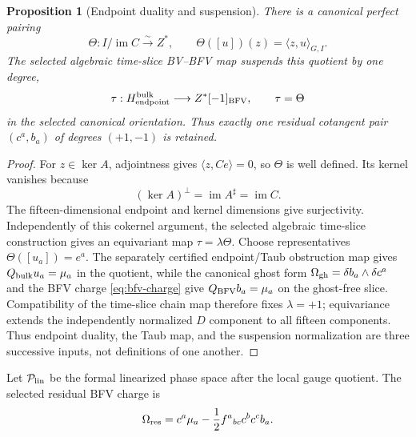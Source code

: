 \documentclass[11pt]{article}
\newtheorem{proposition}[theorem]{Proposition}
\theoremstyle{remark}
\newcommand{\im}{\operatorname{im}}
\begin{document}
\begin{proposition}[Endpoint duality and suspension]\label{prop:endpoint}
There is a canonical perfect pairing
\begin{equation}\label{eq:endpoint}
 \Theta:I/\im C\xrightarrow{\sim}Z^*,
 \qquad \Theta([u])(z)=\langle z,u\rangle_{G,I}.
\end{equation}
The selected algebraic time-slice BV--BFV map suspends this quotient by one
degree,
\begin{equation}\label{eq:suspension}
 \tau:H^{\rm bulk}_{\rm endpoint}\longrightarrow Z^*[-1]_{\rm BFV},
 \qquad \tau=\Theta
\end{equation}
in the selected canonical orientation.  Thus exactly one residual cotangent
pair $(c^a,b_a)$ of degrees $(+1,-1)$ is retained.
\end{proposition}

\begin{proof}
For $z\in\ker A$, adjointness gives $\langle z,Ce\rangle=0$, so $\Theta$
is well defined.  Its kernel vanishes because
\begin{equation*}
 (\ker A)^\perp=\im A^\sharp=\im C.
\end{equation*}
The fifteen-dimensional endpoint and kernel dimensions give surjectivity.
Independently of this cokernel argument, the selected algebraic time-slice
construction gives an equivariant map $\tau=\lambda\Theta$.  Choose representatives
$\Theta([u_a])=e^a$.  The separately certified endpoint/Taub obstruction map
gives $Q_{\rm bulk}u_a=\mu_a$ in the quotient, while the canonical ghost form
$\Omega_{\rm gh}=\delta b_a\wedge\delta c^a$ and the BFV charge
\eqref{eq:bfv-charge} give $Q_{\rm BFV}b_a=\mu_a$ on the ghost-free slice.
Compatibility of the time-slice chain map therefore fixes $\lambda=+1$;
equivariance extends the independently normalized $D$ component to all
fifteen components.  Thus endpoint duality, the Taub map, and the suspension
normalization are three successive inputs, not definitions of one another.
\end{proof}

Let $\mathcal P_{\rm lin}$ be the formal linearized phase space after the
local gauge quotient.  The selected residual BFV charge is
\begin{equation}\label{eq:bfv-charge}
 \Omega_{\rm res}
 =c^a\mu_a-\frac12f^a{}_{bc}c^bc^cb_a.
\end{equation}
\end{document}
